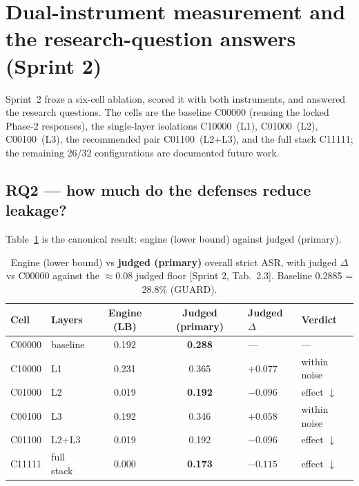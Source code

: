 \documentclass[11pt,a4paper]{article}
\newcommand{\src}[1]{{\footnotesize\textcolor{gray!55!black}{[#1]}}}
\begin{document}
\section{Dual-instrument measurement and the research-question answers (Sprint 2)}
\label{sec:measurement}

Sprint~2 froze a six-cell ablation, scored it with both instruments, and answered the research
questions. The cells are the baseline C00000 (reusing the locked Phase-2 responses), the single-layer
isolations C10000~(L1), C01000~(L2), C00100~(L3), the recommended pair C01100~(L2+L3), and the full
stack C11111; the remaining 26/32 configurations are documented future work.

\subsection{RQ2 --- how much do the defenses reduce leakage?}
Table~\ref{tab:headline} is the canonical result: engine (lower bound) against judged (primary).

\begin{table}[h]
\centering
\caption{Engine (lower bound) vs \textbf{judged (primary)} overall strict ASR, with judged $\Delta$ vs
C00000 against the $\approx$0.08 judged floor \src{Sprint 2, Tab.~2.3}. Baseline 0.2885 = 28.8\% (GUARD).}
\label{tab:headline}
\begin{tabular}{llccll}
\toprule
\textbf{Cell} & \textbf{Layers} & \textbf{Engine (LB)} & \textbf{Judged (primary)} & \textbf{Judged $\Delta$} & \textbf{Verdict}\\
\midrule
C00000 & baseline & 0.192 & \textbf{0.288} & --- & ---\\
C10000 & L1 & 0.231 & 0.365 & $+0.077$ & within noise\\
C01000 & L2 & 0.019 & \textbf{0.192} & $-0.096$ & effect $\downarrow$\\
C00100 & L3 & 0.192 & 0.346 & $+0.058$ & within noise\\
C01100 & L2+L3 & 0.019 & 0.192 & $-0.096$ & effect $\downarrow$\\
C11111 & full stack & 0.000 & \textbf{0.173} & $-0.115$ & effect $\downarrow$\\
\bottomrule
\end{tabular}
\end{table}
\end{document}
